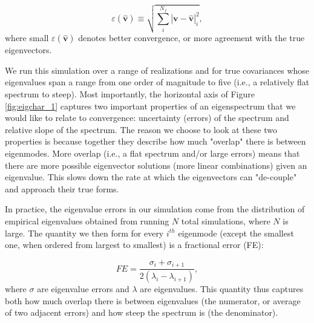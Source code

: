 \begin{equation}
\label{eq:converge_eig2}
\varepsilon (\widehat{\textbf{v}}) \equiv \sqrt{\sum_{i}^{N_{f}}|\textbf{v}-\widehat{\textbf{v}}|_{i}^2},
\end{equation}
where small $\varepsilon (\widehat{\textbf{v}})$ denotes better convergence, or more agreement with the true eigenvectors.

We run this simulation over a range of realizations and for true covariances whose eigenvalues span a range from one order of magnitude to five (i.e., a relatively flat spectrum to steep). Most importantly, the horizontal axis of Figure \ref{fig:eigchar_1} captures two important properties of an eigenspectrum that we would like to relate to convergence: uncertainty (errors) of the spectrum and relative slope of the spectrum. The reason we choose to look at these two properties is because together they describe how much "overlap" there is between eigenmodes. More overlap (i.e., a flat spectrum and/or large errors) means that there are more possible eigenvector solutions (more linear combinations) given an eigenvalue. This slows down the rate at which the eigenvectors can "de-couple" and approach their true forms. 

In practice, the eigenvalue errors in our simulation come from the distribution of empirical eigenvalues obtained from running $N$ total simulations, where $N$ is large. The quantity we then form for every $i^{th}$ eigenmode (except the smallest one, when ordered from largest to smallest) is a fractional error (FE):

\begin{equation}
FE = \frac{\sigma_{i} + \sigma_{i+1}}{2(\lambda_{i} - \lambda_{i+1})},
\end{equation}
where $\sigma$ are eigenvalue errors and $\lambda$ are eigenvalues. This quantity thus captures both how much overlap there is between eigenvalues (the numerator, or average of two adjacent errors) and how steep the spectrum is (the denominator). 

